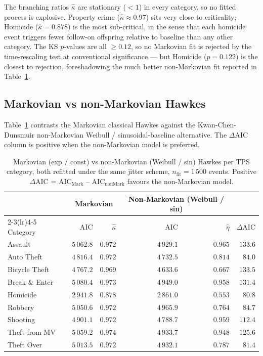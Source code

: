 \documentclass[article,shortnames,nojss]{jss}
\begin{document}
The branching ratios $\hat\kappa$ are stationary ($<1$) in every
category, so no fitted process is explosive.  Property crime
($\hat\kappa\approx 0.97$) sits very close to criticality;
Homicide ($\hat\kappa = 0.878$) is the most sub-critical, in the
sense that each homicide event triggers fewer follow-on offspring
relative to baseline than any other category.  The KS $p$-values
are all $\ge 0.12$, so no Markovian fit is rejected by the
time-rescaling test at conventional significance — but
Homicide ($p=0.122$) is the closest to rejection, foreshadowing the
much better non-Markovian fit reported in
Table~\ref{tab:hawkes-mvsnm}.

\subsection{Markovian vs non-Markovian Hawkes}\label{phys-markov-nonmarkov}

Table~\ref{tab:hawkes-mvsnm} contrasts the Markovian classical
Hawkes against the Kwan-Chen-Dunsmuir non-Markovian Weibull /
sinusoidal-baseline alternative.  The $\Delta\mathrm{AIC}$ column
is positive when the non-Markovian model is preferred.

\begin{table}[h]
\centering\small
\caption{Markovian (exp / const) vs non-Markovian (Weibull / sin)
Hawkes per TPS category, both refitted under the same jitter
scheme, $n_{\mathrm{fit}} = 1\,500$ events.  Positive
$\Delta\mathrm{AIC}$ = AIC$_{\text{Mark}}$ -- AIC$_{\text{nonMark}}$
favours the non-Markovian model.}\label{tab:hawkes-mvsnm}
\begin{tabular}{lrrrrr}
\toprule
& \multicolumn{2}{c}{Markovian} &
   \multicolumn{2}{c}{Non-Markovian (Weibull / sin)} & \\
\cmidrule(lr){2-3}\cmidrule(lr){4-5}
Category & AIC & $\hat\kappa$ & AIC & $\hat\eta$ & $\Delta\mathrm{AIC}$\\\midrule
Assault       & $5\,062.8$ & $0.972$ & $4\,929.1$ & $0.965$ & $133.6$\\
Auto Theft    & $4\,816.4$ & $0.972$ & $4\,732.5$ & $0.814$ & $\phantom{0}84.0$\\
Bicycle Theft & $4\,767.2$ & $0.969$ & $4\,633.6$ & $0.667$ & $133.5$\\
Break \& Enter& $5\,080.4$ & $0.973$ & $4\,949.0$ & $0.958$ & $131.4$\\
Homicide      & $2\,941.8$ & $0.878$ & $2\,861.0$ & $0.553$ & $\phantom{0}80.8$\\
Robbery       & $5\,050.6$ & $0.972$ & $4\,965.9$ & $0.764$ & $\phantom{0}84.7$\\
Shooting      & $4\,901.1$ & $0.972$ & $4\,788.7$ & $0.959$ & $112.4$\\
Theft from MV & $5\,059.2$ & $0.974$ & $4\,933.7$ & $0.948$ & $125.6$\\
Theft Over    & $5\,013.5$ & $0.972$ & $4\,932.1$ & $0.787$ & $\phantom{0}81.4$\\
\bottomrule
\end{tabular}
\end{table}
\end{document}

